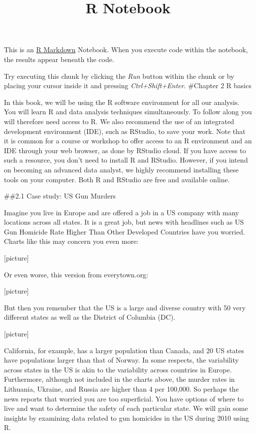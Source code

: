 \documentclass[
]{article}
\title{R Notebook}
\author{}
\date{\vspace{-2.5em}}
\begin{document}
\maketitle

This is an \href{http://rmarkdown.rstudio.com}{R Markdown} Notebook.
When you execute code within the notebook, the results appear beneath
the code.

Try executing this chunk by clicking the \emph{Run} button within the
chunk or by placing your cursor inside it and pressing
\emph{Ctrl+Shift+Enter}. \#Chapter 2 R basics

In this book, we will be using the R software environment for all our
analysis. You will learn R and data analysis techniques simultaneously.
To follow along you will therefore need access to R. We also recommend
the use of an integrated development environment (IDE), such as RStudio,
to save your work. Note that it is common for a course or workshop to
offer access to an R environment and an IDE through your web browser, as
done by RStudio cloud. If you have access to such a resource, you don't
need to install R and RStudio. However, if you intend on becoming an
advanced data analyst, we highly recommend installing these tools on
your computer. Both R and RStudio are free and available online.

\#\#2.1 Case study: US Gun Murders

Imagine you live in Europe and are offered a job in a US company with
many locations across all states. It is a great job, but news with
headlines such as US Gun Homicide Rate Higher Than Other Developed
Countries have you worried. Charts like this may concern you even more:

{[}picture{]}

Or even worse, this version from everytown.org:

{[}picture{]}

But then you remember that the US is a large and diverse country with 50
very different states as well as the District of Columbia (DC).

{[}picture{]}

California, for example, has a larger population than Canada, and 20 US
states have populations larger than that of Norway. In some respects,
the variability across states in the US is akin to the variability
across countries in Europe. Furthermore, although not included in the
charts above, the murder rates in Lithuania, Ukraine, and Russia are
higher than 4 per 100,000. So perhaps the news reports that worried you
are too superficial. You have options of where to live and want to
determine the safety of each particular state. We will gain some
insights by examining data related to gun homicides in the US during
2010 using R.
\end{document}
